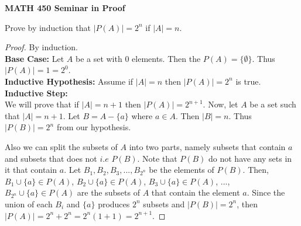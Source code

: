 \documentclass[14pt]{article}
\begin{document}
\begin{center}
		
{\bf MATH 450 Seminar in Proof}
 \\
\end{center}
	Prove by induction that $|P(A)| = 2^n$ if $|A| = n$.\\
\begin{proof}
	 By induction. \\
	
	\textbf{Base Case:} Let $A$ be a set with 0 elements. Then the $P(A) = \{ \emptyset \}$. Thus $|P(A)| = 1 = 2^0$.\\
	\textbf{Inductive Hypothesis:} Assume if $|A| = n$ then $|P(A)| = 2^n$ is true.
	\textbf{Inductive Step:}
	\\ We will prove that if $|A| = n+1$ then $|P(A)| = 2^{n+1}$. Now, let $A$ be a set such that $|A| = n+1$. Let $B = A - \{a\}$ where $a \in A$. Then $|B| = n$. Thus $|P(B)| = 2^n$ from our hypothesis.
	
	 Also we can split the subsets of $A$ into two parts, namely subsets that contain $a$ and subsets that does not $i.e$ $P(B)$. Note that $P(B)$ do not have any sets in it that contain $a$. Let $B_1, B_2, B_3,...,B_{2^n}$ be the elements of $P(B)$. Then, $B_1 \cup \{a\} \in P(A)$, $B_2 \cup \{a\} \in P(A)$, $B_3 \cup \{a\} \in P(A)$, ..., $B_{2^n} \cup \{a\} \in P(A)$ are the subsets of $A$ that contain the element $a$. Since the union of each $B_i$ and $\{a\}$ produces $2^n$ subsets and $|P(B)| =2^n$, then $|P(A)| = 2^n + 2^n = 2^n(1+1) = 2^{n+1}$. 
\end{proof}
\end{document}
